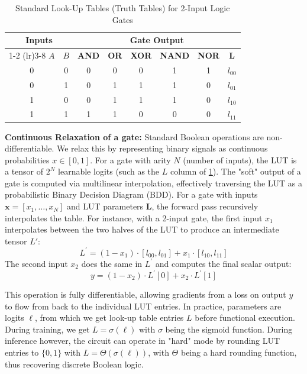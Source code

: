 \begin{table}[h]
    \centering
    \caption{Standard Look-Up Tables (Truth Tables) for 2-Input Logic Gates}
    \label{cha5:tab:std_luts}
    \begin{tabular}{cc|cccccc}
        \toprule
        \multicolumn{2}{c}{\textbf{Inputs}} & \multicolumn{6}{c}{\textbf{Gate Output}} \\
        \cmidrule(lr){1-2} \cmidrule(lr){3-8}
        $A$ & $B$ & \textbf{AND} & \textbf{OR} & \textbf{XOR} & \textbf{NAND} & \textbf{NOR} & \textbf{L} \\
        \midrule
        0 & 0 & 0 & 0 & 0 & 1 & 1 & $l_{00}$ \\
        0 & 1 & 0 & 1 & 1 & 1 & 0 & $l_{01}$ \\
        1 & 0 & 0 & 1 & 1 & 1 & 0 & $l_{10}$ \\
        1 & 1 & 1 & 1 & 0 & 0 & 0 & $l_{11}$ \\
        \bottomrule
    \end{tabular}
\end{table}

\textbf{Continuous Relaxation of a gate:}
Standard Boolean operations are non-differentiable. We relax this by representing binary signals as continuous probabilities $x \in [0, 1]$.
For a gate with arity $N$ (number of inputs), the LUT is a tensor of $2^N$ learnable logits (such as the $L$ column of \cref{cha5:tab:std_luts}).
The "soft" output of a gate is computed via multilinear interpolation, effectively traversing the LUT as a probabilistic Binary Decision Diagram (BDD). For a gate with inputs $\mathbf{x} = [x_1, \dots, x_N]$ and LUT parameters $\mathbf{L}$, the forward pass recursively interpolates the table. For instance, with a 2-input gate, the first input $x_1$ interpolates between the two halves of the LUT to produce an intermediate tensor $L'$:
$$L^{\prime}=\left(1-x_1\right) \cdot\left[l_{00}, l_{01}\right]+ x_1 \cdot\left[l_{10}, l_{11}\right]$$
The second input $x_2$ does the same in $L^{\prime}$ and computes the final scalar output: 
$$y =\left(1-x_2\right)\cdot L^{\prime}[0]+x_2 \cdot L^{\prime}[1]$$

This operation is fully differentiable, allowing gradients from a loss on output $y$ to flow from back to the individual LUT entries. In practice, parameters are logits $\ell$, from which we get look-up table entries $L$ before functional execution. During training, we get $L = \sigma(\ell)$ with $\sigma$ being the sigmoid function. During inference however, the circuit can operate in "hard" mode by rounding LUT entries to $\{0, 1\}$ with $L = \Theta(\sigma(\ell))$, with $\Theta$ being a hard rounding function, thus recovering discrete Boolean logic.

